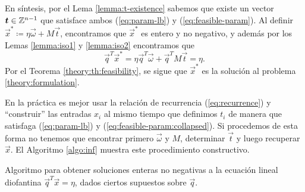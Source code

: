 En síntesis, por el Lema \ref{lemma:t-existence} sabemos que existe un vector
$\boldsymbol{t} \in \mathbb{Z}^{n-1}$ que satisface ambos (\ref{eq:param-lb}) y (\ref{eq:feasible-param}).
Al definir $\vec{x}^* \coloneq \eta\vec{\omega} + M\vec{t}$, encontramos que $\vec{x}^*$ es entero y
no negativo, y además por los Lemas \ref{lemma:iso1} y \ref{lemma:iso2} encontramos que
\begin{equation*}
	\vec{q}^T\vec{x}^* = \eta\vec{q}^T\vec{\omega} + \vec{q}^TM\vec{t} = \eta.
\end{equation*}
Por el Teorema \ref{theory:th:feasibility}, se sigue que $\vec{x}^*$ es la solución al problema
\eqref{theory:formulation}.

En la práctica es mejor usar la relación de recurrencia (\ref{eq:recurrence}) y ``construir'' las
entradas $x_i$ al mismo tiempo que definimos $t_i$ de manera que satisfaga (\ref{eq:param-lb}) y
(\ref{eq:feasible-param:collapsed}). Si procedemos de esta forma no tenemos que encontrar primero
$\vec{\omega}$ y $M$, determinar $\vec{t}$ y luego recuperar $\vec{x}$. El Algoritmo \ref{algo:inf}
muestra este procedimiento constructivo.

\begin{algorithm}[ht]
	\LinesNumbered
	\caption{Algoritmo para obtener soluciones enteras no negativas a la ecuación lineal diofantina
	$\vec{q}^T\vec{x} = \eta$, dados ciertos supuestos sobre $\vec{q}$.}
	\label{algo:inf}
\end{algorithm}

